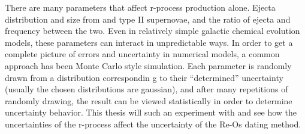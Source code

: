 There are many parameters that affect r-process production alone. Ejecta distribution and size from \nsm and type II supernovae, and the ratio of ejecta and frequency between the two. Even in relatively simple galactic chemical evolution models, these parameters can interact in unpredictable ways. In order to get a complete picture of errors and uncertainty in numerical models, a common approach has been Monte Carlo style simulation. Each parameter is randomly drawn from a distribution correspondin g to their ``determined'' uncertainty (usually the chosen distributions are gaussian), and after many repetitions of randomly drawing, the result can be viewed statistically in order to determine uncertainty behavior.
This thesis will such an experiment with  and see how the uncertainties of the r-process affect the uncertainty of the Re-Os dating method.
